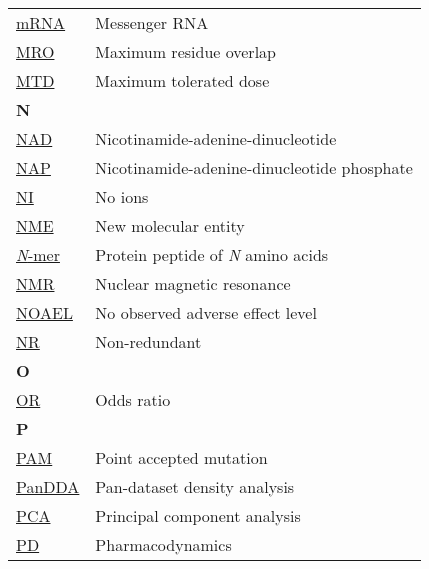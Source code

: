 \begin{longtable}[l]{@{}p{2.5cm}p{12cm}@{}}
\textmd{\href{https://en.wikipedia.org/wiki/Messenger_RNA}{mRNA}} & Messenger RNA \\
\textmd{\href{https://jcheminf.biomedcentral.com/articles/10.1186/s13321-024-00923-z}{MRO}} & Maximum residue overlap \\
\textmd{\href{https://en.wikipedia.org/wiki/Therapeutic_index\#Maximum_tolerated_dose}{MTD}} & Maximum tolerated dose \\[0.3175cm]
\textbf{\large N} & \\[0.25cm]
\textmd{\href{https://www.ebi.ac.uk/pdbe-srv/pdbechem/chemicalCompound/show/NAD}{NAD}} & Nicotinamide-adenine-dinucleotide \\
\textmd{\href{https://www.ebi.ac.uk/pdbe-srv/pdbechem/chemicalCompound/show/NAP}{NAP}} & Nicotinamide-adenine-dinucleotide phosphate \\
\textmd{\href{https://jcheminf.biomedcentral.com/articles/10.1186/s13321-024-00923-z}{NI}} & No ions \\
\textmd{\href{https://en.wikipedia.org/wiki/New_chemical_entity}{NME}} & New molecular entity \\
\textmd{\href{https://en.wikipedia.org/wiki/Peptide}{\textit{N}-mer}} & Protein peptide of \textit{N} amino acids \\
\textmd{\href{https://en.wikipedia.org/wiki/Nuclear_magnetic_resonance_spectroscopy}{NMR}} & Nuclear magnetic resonance \\
\textmd{\href{https://en.wikipedia.org/wiki/No-observed-adverse-effect_level}{NOAEL}} & No observed adverse effect level \\
\textmd{\href{https://jcheminf.biomedcentral.com/articles/10.1186/s13321-024-00923-z}{NR}} & Non-redundant \\[0.3175cm]
\textbf{\large O} & \\[0.25cm]
\textmd{\href{https://en.wikipedia.org/wiki/Odds_ratio}{OR}} & Odds ratio \\[0.3175cm]
\textbf{\large P} & \\[0.25cm]
\textmd{\href{https://en.wikipedia.org/wiki/Point_accepted_mutation}{PAM}} & Point accepted mutation \\
\textmd{\href{https://www.nature.com/articles/ncomms15123}{PanDDA}} & Pan-dataset density analysis \\
\textmd{\href{https://en.wikipedia.org/wiki/Principal_component_analysis}{PCA}} & Principal component analysis \\
\textmd{\href{https://en.wikipedia.org/wiki/Pharmacodynamics}{PD}} & Pharmacodynamics \\ 

\end{longtable}
